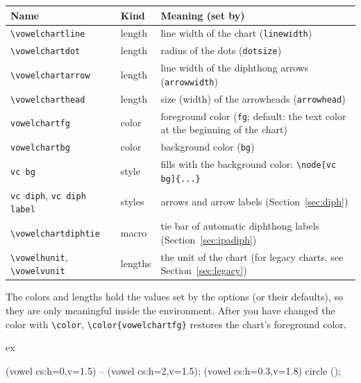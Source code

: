 \documentclass[a4paper,11pt]{article}
\newcommand\cmd[1]{\texttt{\textbackslash #1}}
\newcommand\opt[1]{\texttt{#1}}
\begin{document}
\begin{center}\small
	\begin{tabular}{@{}llp{10.2cm}@{}}
		\toprule
		Name & Kind & Meaning (set by)\\
		\midrule
		\cmd{vowelchartline} & length & line width of the chart (\opt{linewidth}) \\
		\cmd{vowelchartdot} & length & radius of the dots (\opt{dotsize}) \\
		\cmd{vowelchartarrow} & length & line width of the diphthong arrows (\opt{arrowwidth}) \\
		\cmd{vowelcharthead} & length & size (width) of the arrowheads (\opt{arrowhead}) \\
		\texttt{vowelchartfg} & color & foreground color (\opt{fg}; default: the text color at the beginning of the chart) \\
		\texttt{vowelchartbg} & color & background color (\opt{bg}) \\
		\texttt{vc bg} & style & fills with the background color: \verb|\node[vc bg]{...}| \\
		\texttt{vc diph}, \texttt{vc diph label} & styles & arrows and arrow labels (Section~\ref{sec:diph}) \\
		\cmd{vowelchartdiphtie} & macro & tie bar of automatic diphthong labels (Section~\ref{sec:ipadiph}) \\
		\cmd{vowelhunit}, \cmd{vowelvunit} & lengths & the unit of the chart (for legacy charts, see Section~\ref{sec:legacy}) \\
		\bottomrule
	\end{tabular}
\end{center}

\noindent
The colors and lengths hold the values set by the options (or their defaults), so they are only meaningful inside the environment. After you have changed the color with \cmd{color}, \verb|\color{vowelchartfg}| restores the chart's foreground color.

\begin{tcblisting}{ex}
\begin{vowelchart}[fg=blue!50!black, bg=cyan!10, bgmargin=0.3cm, linewidth=.4pt, width=4cm]
  \draw[line width=2\vowelchartline, vowelchartfg!50]
  (vowel cs:h=0,v=1.5) -- (vowel cs:h=2,v=1.5);
  \draw[vowelchartfg] (vowel cs:h=0.3,v=1.8) circle (\vowelchartdot);
\end{vowelchart}
\end{tcblisting}
\end{document}
